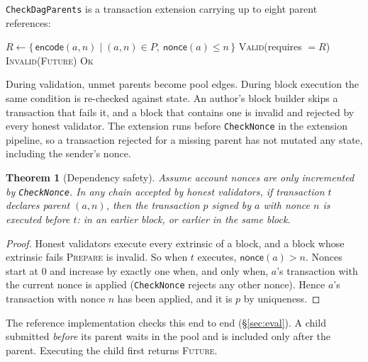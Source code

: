 \documentclass[11pt]{article}
\newtheorem{theorem}{Theorem}
\theoremstyle{definition}
\theoremstyle{remark}
\begin{document}
\texttt{CheckDagParents} is a transaction extension carrying up to eight parent references:

\begin{algorithm}[ht]
\caption{\texttt{CheckDagParents} (pool validation and block execution)}
\begin{algorithmic}[1]
  
  \State $R \gets \{\, \mathsf{encode}(a, n) \mid (a,n) \in P,\ \mathsf{nonce}(a) \le n \,\}$
  \State \Return \textsc{Valid}(requires $=R$)  
\EndFunction
{} 
     \State \Return \textsc{Invalid}(\textsc{Future})
  \EndIf
  \State \Return \textsc{Ok}
\EndFunction
\end{algorithmic}
\end{algorithm}

During validation, unmet parents become pool edges. During block execution the same condition is
re-checked against state. An author's block builder skips a transaction that fails it, and a block
that contains one is invalid and rejected by every honest validator. The extension runs before
\texttt{CheckNonce} in the extension pipeline, so a transaction rejected for a missing parent has
not mutated any state, including the sender's nonce.

\begin{theorem}[Dependency safety]
Assume account nonces are only incremented by \texttt{CheckNonce}. In any chain accepted by honest
validators, if transaction $t$ declares parent $(a, n)$, then the transaction $p$ signed by $a$ with
nonce $n$ is executed before $t$: in an earlier block, or earlier in the same block.
\end{theorem}
\begin{proof}
Honest validators execute every extrinsic of a block, and a block whose extrinsic fails
\textsc{Prepare} is invalid. So when $t$ executes, $\mathsf{nonce}(a) > n$. Nonces start at $0$ and
increase by exactly one when, and only when, $a$'s transaction with the current nonce is applied
(\texttt{CheckNonce} rejects any other nonce). Hence $a$'s transaction with nonce $n$ has been
applied, and it is $p$ by uniqueness.
\end{proof}

\noindent
The reference implementation checks this end to end (\S\ref{sec:eval}). A child submitted
\emph{before} its parent waits in the pool and is included only after the parent. Executing the
child first returns \textsc{Future}.
\end{document}
